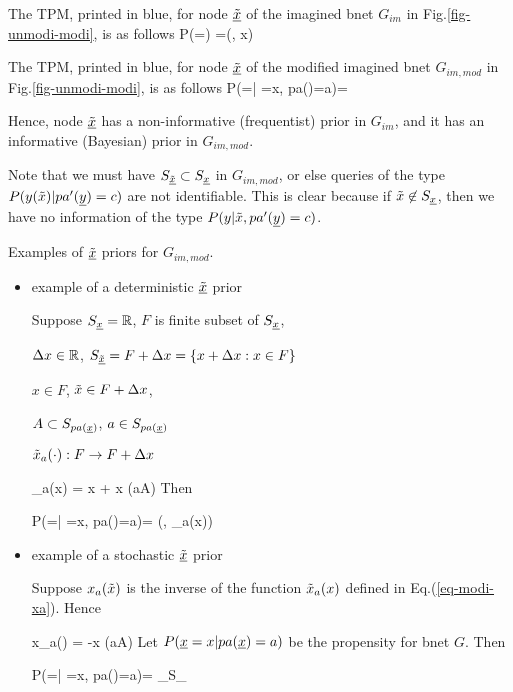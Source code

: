 The TPM, printed in  blue, for node $\underline{{\tilde{x}}}$
of the imagined bnet $G_{im}$ in Fig.\ref{fig-unmodi-modi}, is as follows
\beq\color{blue}
P(\ul{\tilx}=\tilx) =\delta(\tilx, x)
\eeq

The TPM, printed in  blue, for node $\underline{{\tilde{x}}}$
of the modified imagined bnet $G_{im,mod}$ in Fig.\ref{fig-unmodi-modi},
 is as follows
\beq\color{blue}
P(\ul{\tilx}=\tilx | \rvx=x, pa(\rvx)=a)= 
\eeq

Hence, node $\underline{{\tilde{x}}}$
has a non-informative (frequentist) prior in $G_{im}$,
and it has an informative (Bayesian) prior in $G_{im,mod}$.

Note that we must have $S_{\underline{{\tilde{x}}}}\subset S_{\underline{x}}$ in $G_{im,mod}$,
or else queries of the type
 $P(y({\tilde{x}})|pa'({\underline{y}})=c)$ are not identifiable.
This is clear because if ${\tilde{x}}\not\in S_{\underline{x}}$,
then we have no information of the type $P(y|{\tilde{x}}, pa'({\underline{y}})=c)$.


Examples of $\underline{{\tilde{x}}}$ priors for $G_{im,mod}$.
\begin{itemize}
\item example of a deterministic $\underline{{\tilde{x}}}$  prior

Suppose
$S_{\underline{x}}={ \mathbb{R}}$,
$F$ is finite subset of $S_{\underline{x}}$,

$\Delta x\in { \mathbb{R}}$,
$S_{\underline{{\tilde{x}}}}= F+\Delta x = \{x+\Delta x: x\in F\}$

$x\in F$, ${\tilde{x}}\in F+\Delta x$,

$A\subset S_{pa({\underline{x}})}$, $a\in S_{pa({\underline{x}})}$

${\tilde{x}}_a(\cdot):F\rightarrow F+\Delta x$

\beq
\tilx_a(x) = x + \Delta x \indi(a\in A)
\label{eq-modi-xa}
\eeq
Then

\beq\color{blue}
P(\ul{\tilx}=\tilx | \rvx=x, pa(\rvx)=a)= \delta(\tilx, \tilx_a(x))
\eeq

\item example of a stochastic $\underline{{\tilde{x}}}$  prior

Suppose $x_a({\tilde{x}})$ is the inverse of
the function ${\tilde{x}}_a(x)$ defined in Eq.(\ref{eq-modi-xa}).
Hence

\beq
x_a(\tilx) = \tilx -\Delta x \indi(a\in A)
\eeq
Let $P({\underline{x}}=x |pa({\underline{x}})=a)$ be the propensity for bnet $G$.
Then

\beq\color{blue}
P(\ul{\tilx}=\tilx | \rvx=x, pa(\rvx)=a)=
{\sum_{\tilx\in S_{\ul{\tilx}}} }
\eeq


\end{itemize}
